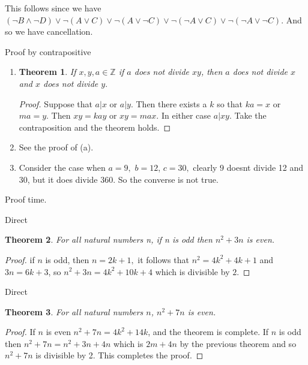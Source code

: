 \documentclass[letter]{article}
\newtheorem{theorem}{Theorem}
\newenvironment{menumerate}{%
  \edef\backupindent{\the\parindent}%
  \enumerate%
  \setlength{\parindent}{\backupindent}%
}{\endenumerate}
\begin{document}
\begin{menumerate}
\begin{menumerate}
      This follows since we have $(\neg B \wedge \neg D) \vee \neg ( A \vee C) \vee \neg (A \vee \neg C) \vee \neg (\neg A \vee C) \vee \neg (\neg A \vee \neg C).$
      And so we have cancellation.
    \end{menumerate}
    \item Proof by contrapositive
    \begin{enumerate}
        \item \begin{theorem}
            If $x,y, a \in \mathbb{Z}$ if $a$ does not divide $xy$, then 
            $a$ does not divide $x$ and $x$ does not divide $y.$
        \end{theorem}   
        \begin{proof}
          Suppose that $a | x$ or $a | y$. Then there exists a $k$ so that
          $ka = x$ or $ma = y.$ Then $xy = kay$ or $xy = max$. In either case 
          $a | xy.$ Take the contraposition and the theorem holds.
        \end{proof}
        \item See the proof of (a).
        \item Consider the case when $a =9,$ $b = 12$, $c = 30,$ clearly $9$ doesnt divide 12 and 30, but it does divide $360.$
        So the converse is not true. 
    \end{enumerate}
    \item Proof time.
    \begin{menumerate}
        \item Direct
        \begin{theorem}
            For all natural numbers n, if n is odd then $n^2 + 3n$ is even.
        \end{theorem}
        \begin{proof}
            if $n$ is odd, then $n = 2k+1,$ it follows that $n^2 = 4k^2+ 4k + 1$ and $3n = 6k + 3$,
            so $n^2 + 3n = 4k^2 + 10k + 4$ which is divisible by $2.$
        \end{proof}

        \item Direct
        \begin{theorem}
            For all natural numbers $n$, $n^2 + 7n$ is even. 
        \end{theorem}
        \begin{proof}
            If $n$ is even $n^2 + 7n= 4k^2 + 14k$, and the theorem is complete.
            If $n$ is odd then $n^2 + 7n = n^2 + 3n +4n$ which is $2m + 4n$ by the previous theorem
            and so $n^2 + 7n$ is divisible by 2.
            This completes the proof.
        \end{proof}


\end{menumerate}
\end{menumerate}
\end{document}
